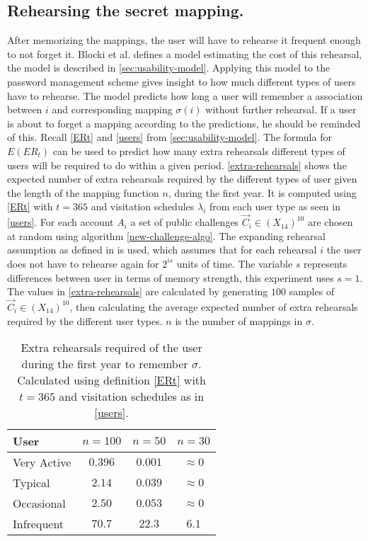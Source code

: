 \subsection{Rehearsing the secret mapping.}
After memorizing the mappings, the user will have to rehearse it frequent enough to not forget it. Blocki et al. \cite{naturally-rehearsing} defines a model estimating the cost of this rehearsal, the model is described in \autoref{sec:usability-model}. Applying this model to the password management scheme gives insight to how much different types of users have to rehearse. The model predicts how long a user will remember a association between $i$ and corresponding mapping $\sigma(i)$ without further rehearsal. If a user is about to forget a mapping according to the predictions, he should be reminded of this. Recall \autoref{ERt} and \autoref{users} from \autoref{sec:usability-model}. The formula for $E(ER_t)$ can be used to predict how many extra rehearsals different types of users will be required to do within a given period. \autoref{extra-rehearsals} shows the expected number of extra rehearsals required by the different types of user given the length of the mapping function $n$, during the first year. It is computed using \autoref{ERt} with $t=365$ and visitation schedules $\lambda_i$ from each user type as seen in \autoref{users}. For each account $A_i$ a set of public challenges $\vec C_i \in (X_{14})^{10}$ are chosen at random using algorithm \ref{new-challenge-algo}. The expanding rehearsal assumption as defined in \cite{ER} is used, which assumes that for each rehearsal $i$ the user does not have to rehearse again for $2^{is}$ units of time. The variable $s$ represents differences between user in terms of memory strength, this experiment uses $s=1$. The values in \autoref{extra-rehearsals} are calculated by generating $100$ samples of $\vec C_i \in (X_{14})^{10}$, then calculating the average expected number of extra rehearsals required by the different user types. $n$ is the number of mappings in $\sigma$.

\begin{table}
    \centering
    \begin{tabular}{ |l|c|c|c| }
        \hline
        User & $n=100$ & $n=50$ & $n=30$ \\
        \hline \hline
        Very Active & $0.396$ & $0.001$ & $\approx 0$ \\
        \hline
        Typical & $2.14$ & $0.039$ & $\approx 0$ \\
        \hline
        Occasional & $2.50$ & $0.053$ & $\approx 0 $  \\
        \hline
        Infrequent & $70.7$ & $22.3$ & $6.1$ \\
        \hline

    \end{tabular}
    \caption{\cite{hcp-blocki} Extra rehearsals required of the user during the first year to remember $\sigma$. Calculated using definition \ref{ERt} with $t=365$ and visitation schedules as in \autoref{users}.}
    \label{extra-rehearsals}
\end{table}

